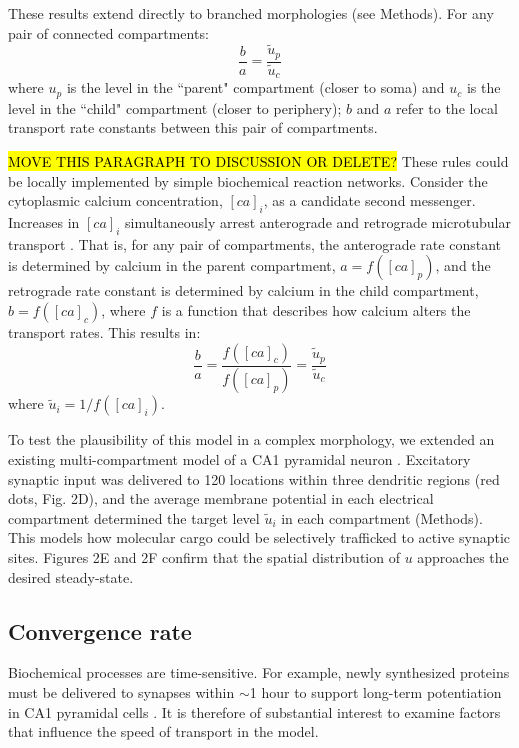 \documentclass[10pt]{wlpeerj}
\begin{document}
These results extend directly to branched morphologies (see Methods). For any pair of connected compartments:
\begin{equation}
\frac{b}{a} = \frac{\tilde{u}_p}{\tilde{u}_c}
\end{equation}
where $u_p$ is the level in the ``parent" compartment (closer to soma) and $u_c$ is the level in the ``child" compartment (closer to periphery); $b$ and $a$ refer to the local transport rate constants between this pair of compartments.


\hl{MOVE THIS PARAGRAPH TO DISCUSSION OR DELETE?} These rules could be locally implemented by simple biochemical reaction networks. Consider the cytoplasmic calcium concentration, $[ca]_i$, as a candidate second messenger. Increases in $[ca]_i$ simultaneously arrest anterograde and retrograde microtubular transport \citep{Wang_2009}. That is, for any pair of compartments, the anterograde rate constant is determined by calcium in the parent compartment, $a = f([ca]_p)$,  and the retrograde rate constant is determined by calcium in the child compartment, $b = f([ca]_c)$, where $f$ is a function that describes how calcium alters the transport rates. This results in:
\begin{equation}
\frac{b}{a} = \frac{f([ca]_c)}{f([ca]_p)} = \frac{\tilde{u}_p}{\tilde{u}_c}
\end{equation}
where $\tilde{u}_i = 1/f([ca]_i)$.


To test the plausibility of this model in a complex morphology, we extended an existing multi-compartment model of a CA1 pyramidal neuron \citep{Migliore_2012}. Excitatory synaptic input was delivered to 120 locations within three dendritic regions (red dots, Fig. 2D), and the average membrane potential in each electrical compartment determined the target level $\tilde{u}_i$ in each compartment (Methods). This models how molecular cargo could be selectively trafficked to active synaptic sites. Figures 2E and 2F confirm that the spatial distribution of $u$ approaches the desired steady-state.

\subsection*{Convergence rate}

Biochemical processes are time-sensitive.
For example, newly synthesized proteins must be delivered to synapses within $\sim$1 hour to support long-term potentiation in CA1 pyramidal cells \citep{Frey_1997,Frey_1998}.
It is therefore of substantial interest to examine factors that influence the speed of transport in the model.
\end{document}
